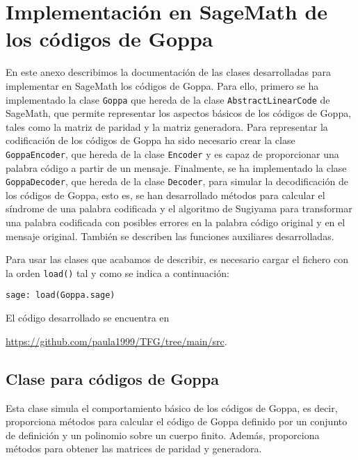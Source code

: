 \chapter[Implementación en SageMath de los códigos de Goppa]{Implementación en SageMath de los códigos de Goppa}
\label{annex:sage-Goppa}

En este anexo describimos la documentación de las clases desarrolladas para implementar en SageMath los códigos de Goppa. Para ello, primero se ha implementado la clase \texttt{Goppa} que hereda de la clase \texttt{AbstractLinearCode} de SageMath, que permite representar los aspectos básicos de los códigos de Goppa, tales como la matriz de paridad y la matriz generadora. Para representar la codificación de los códigos de Goppa ha sido necesario crear la clase \texttt{GoppaEncoder}, que hereda de la clase \texttt{Encoder} y es capaz de proporcionar una palabra código a partir de un mensaje. Finalmente, se ha implementado la clase \texttt{GoppaDecoder}, que hereda de la clase \texttt{Decoder}, para simular la decodificación de los códigos de Goppa, esto es, se han desarrollado métodos para calcular el síndrome de una palabra codificada y el algoritmo de Sugiyama para transformar una palabra codificada con posibles errores en la palabra código original y en el mensaje original. También se describen las funciones auxiliares desarrolladas.

Para usar las clases que acabamos de describir, es necesario cargar el fichero con la orden \texttt{load()} tal y como se indica a continuación:

\begin{lstlisting}[gobble=4]
    sage: load(Goppa.sage)
\end{lstlisting}

El código desarrollado se encuentra en
\begin{center}
    \url{https://github.com/paula1999/TFG/tree/main/src}.
\end{center}

\section{Clase para códigos de Goppa}

Esta clase simula el comportamiento básico de los códigos de Goppa, es decir, proporciona métodos para calcular el código de Goppa definido por un conjunto de definición y un polinomio sobre un cuerpo finito. Además, proporciona métodos para obtener las matrices de paridad y generadora.


